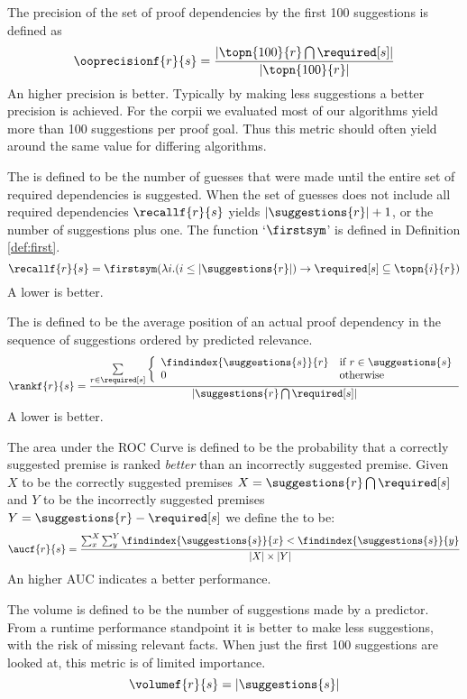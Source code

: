 \begin{definition}[\ooprecision]
  The precision of the set of proof dependencies by the first 100 suggestions is defined as
  \[ \ooprecisionf{r}{s} = \frac{ |\topn{100}{r} \bigcap \required[s]| } { |\topn{100}{r}| } \]
  An higher precision is better.
  Typically by making less suggestions a better precision is achieved.
  For the corpii we evaluated most of our algorithms yield more than 100 suggestions per proof goal.
  Thus this metric should often yield around the same value for differing algorithms.
\end{definition}

\begin{definition}[\recall]
  The \recall is defined to be the number of guesses that were made until the entire set of required dependencies is suggested.
  When the set of guesses does not include all required dependencies $\recallf{r}{s}$ yields $|\suggestions{r}|+1$,
  or the number of suggestions plus one.
  The function `$\firstsym$' is defined in Definition \ref{def:first}.
  \[ \recallf{r}{s} = \firstsym(\lambda i. (i \leq |\suggestions{r}|) \rightarrow \required[s] \subseteq \topn{i}{r}) \]
  A lower \recall is better.
\end{definition}

\begin{definition}[\rank]
  The \rank is defined to be the average position of an actual proof dependency in the sequence of suggestions ordered by predicted relevance.
  \[ \rankf{r}{s} = \frac{
      \sum\limits_{r \in \required[s]} \left\{
        \begin{array}{ll}
          \findindex{\suggestions{s}}{r} & \text{if~} r \in \suggestions{s} \\
          0 & \text{otherwise} \\
        \end{array}
        \right.
    }{
      |\suggestions{r} \bigcap \required[s]|
    }
  \]
  A lower \rank is better.
\end{definition}

\begin{definition}
  The area under the ROC Curve is defined to be the probability that a correctly suggested premise is ranked \emph{better} than an incorrectly suggested premise.
  Given $X$ to be the correctly suggested premises $X = \suggestions{r} \bigcap \required[s]$ and $Y$ to be the incorrectly suggested premises $Y = \suggestions{r} - \required[s]$ we define the \auc to be:
  \[
    \aucf{r}{s} = \frac{
      \sum_x^X \sum_y^Y {\findindex{\suggestions{s}}{x} < \findindex{\suggestions{s}}{y}}
    }{
      |X| \times |Y|
    }
  \]
  An higher AUC indicates a better performance.
\end{definition}

\begin{definition}[\volume]
  The volume is defined to be the number of suggestions made by a predictor.
  From a runtime performance standpoint it is better to make less suggestions, with the risk of missing relevant facts.
  When just the first 100 suggestions are looked at, this metric is of limited importance.
  \[
    \volumef{r}{s} = |\suggestions{s}|
  \]
\end{definition}
